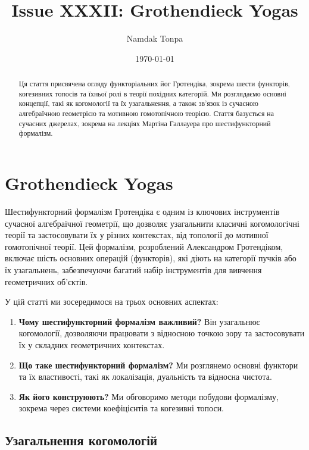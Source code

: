 \documentclass{article}
\theoremstyle{plain}
\theoremstyle{definition}
\begin{document}
\title{Issue XXXII: Grothendieck Yogas}
\author{Namdak Tonpa}
\date{\today}

\maketitle

\begin{abstract}
Ця стаття присвячена огляду функторіальних йог Гротендіка,
зокрема шести функторів, когезивних топосів та їхньої ролі
в теорії похідних категорій. Ми розглядаємо основні концепції,
такі як когомології та їх узагальнення, а також зв’язок із сучасною
алгебраїчною геометрією та мотивною гомотопічною теорією.
Стаття базується на сучасних джерелах, зокрема на лекціях
Мартіна Галлауера про шестифункторний формалізм.
\end{abstract}

\ifincludeTOC
  \tableofcontents
\fi

\section{Grothendieck Yogas}

Шестифункторний формалізм Гротендіка є одним із ключових інструментів сучасної алгебраїчної геометрії, що дозволяє узагальнити класичні когомологічні теорії та застосовувати їх у різних контекстах, від топології до мотивної гомотопічної теорії. Цей формалізм, розроблений Александром Гротендіком, включає шість основних операцій (функторів), які діють на категорії пучків або їх узагальнень, забезпечуючи багатий набір інструментів для вивчення геометричних об’єктів.

У цій статті ми зосередимося на трьох основних аспектах:
\begin{enumerate}
    \item \textbf{Чому шестифункторний формалізм важливий?} Він узагальнює когомології, дозволяючи працювати з відносною точкою зору та застосовувати їх у складних геометричних контекстах.
    \item \textbf{Що таке шестифункторний формалізм?} Ми розглянемо основні функтори та їх властивості, такі як локалізація, дуальність та відносна чистота.
    \item \textbf{Як його конструюють?} Ми обговоримо методи побудови формалізму, зокрема через системи коефіцієнтів та когезивні топоси.
\end{enumerate}

\subsection{Узагальнення когомологій}
\end{document}
